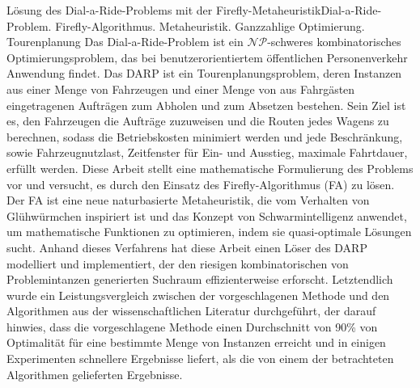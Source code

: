 \documentclass[tuberlin,cic,tc,openright,english,noabntcite,oneside]{iiufrgs}
\begin{document}
\begin{englishabstract}{Lösung des Dial-a-Ride-Problems mit der Firefly-Metaheuristik}{Dial-a-Ride-Problem. Firefly-Algorithmus. Metaheuristik. Ganzzahlige Optimierung. Tourenplanung}
Das Dial-a-Ride-Problem ist ein $\mathcal{NP}$-schweres kombinatorisches Optimierungsproblem, das bei benutzerorientiertem öffentlichen Personenverkehr Anwendung findet. Das DARP ist ein Tourenplanungsproblem, deren Instanzen aus einer Menge von Fahrzeugen und einer Menge von aus Fahrgästen eingetragenen Aufträgen zum Abholen und zum Absetzen bestehen. Sein Ziel ist es, den Fahrzeugen die Aufträge zuzuweisen und die Routen jedes Wagens zu berechnen, sodass die Betriebskosten minimiert werden und jede Beschränkung, sowie Fahrzeugnutzlast, Zeitfenster für Ein- und Ausstieg, maximale Fahrtdauer, erfüllt werden. Diese Arbeit stellt eine mathematische Formulierung des Problems vor und versucht, es durch den Einsatz des Firefly-Algorithmus (FA) zu lösen. Der FA ist eine neue naturbasierte Metaheuristik, die vom Verhalten von Glühwürmchen inspiriert ist und das Konzept von Schwarmintelligenz anwendet, um mathematische Funktionen zu optimieren, indem sie quasi-optimale Lösungen sucht. Anhand dieses Verfahrens hat diese Arbeit einen Löser des DARP modelliert und implementiert, der den riesigen kombinatorischen von Problemintanzen generierten Suchraum effizienterweise erforscht. Letztendlich wurde ein Leistungsvergleich zwischen der vorgeschlagenen Methode und den Algorithmen aus der wissenschaftlichen Literatur durchgeführt, der darauf hinwies, dass die vorgeschlagene Methode einen Durchschnitt von 90\% von Optimalität für eine bestimmte Menge von Instanzen erreicht und in einigen Experimenten schnellere Ergebnisse liefert, als die von einem der betrachteten Algorithmen gelieferten Ergebnisse.
\end{englishabstract}

\listoffigures

\listoftables
\end{document}
